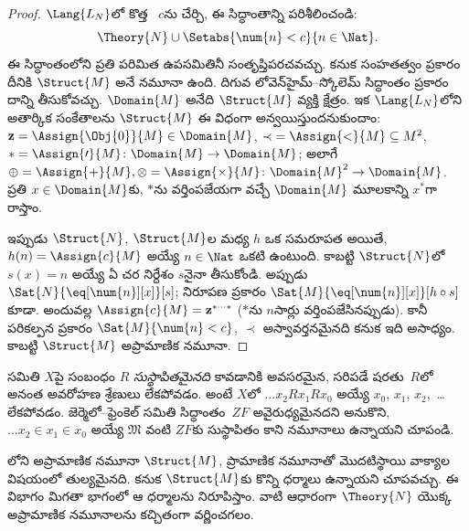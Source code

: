 \documentclass[../../../include/open-logic-section]{subfiles}
\begin{document}
\begin{proof}
$\Lang{L_N}$లో కొత్త ~$c$ను చేర్చి, ఈ సిద్ధాంతాన్ని పరిశీలించండి:
\[
\Theory{N} \cup \Setabs{\num{n} < c}{n \in \Nat}.
\]
ఈ సిద్ధాంతంలోని ప్రతి పరిమిత ఉపసమితినీ సంతృప్తిపరచవచ్చు. కనుక సంహతత్వం ప్రకారం దీనికి $\Struct{M}$ అనే నమూనా ఉంది. దిగువ లోవెన్‌హైమ్--స్కోలెమ్ సిద్ధాంతం ప్రకారం దాన్ని  తీసుకోవచ్చు. $\Domain{M}$ అనేది $\Struct{M}$ వ్యక్తి క్షేత్రం. ఇక $\Lang{L_N}$లోని అతార్కిక సంకేతాలను $\Struct{M}$ ఈ విధంగా అన్వయిస్తుందనుకుందాం: $\mathbf{z} = \Assign{\Obj{0}}{M} \in \Domain{M}$, ${\prec} =
\Assign{<}{M} \subseteq M^2$, $* = \Assign{\prime}{M} \colon
\Domain{M} \to \Domain{M}$; అలాగే $\oplus = \Assign{+}{M}, \otimes =
\Assign{\times}{M} \colon \Domain{M}^2 \to \Domain{M}$. ప్రతి $x
\in \Domain{M}$కు, $*$ను వర్తింపజేయగా వచ్చే $\Domain{M}$ మూలకాన్ని $x^*$గా రాస్తాం.

ఇప్పుడు $\Struct{N}$, $\Struct{M}$ల మధ్య $h$ ఒక సమరూపత అయితే, $h(n) = \Assign{c}{M}$ అయ్యే $n \in \Nat$ ఒకటి ఉంటుంది. కాబట్టి $\Struct{N}$లో $s(x) = n$ అయ్యే ఏ చర నిర్దేశం $s$నైనా తీసుకోండి. అప్పుడు $\Sat{N}{\eq[\num{n}][x]}[s]$;  నిరూపణ ప్రకారం $\Sat{M}{\eq[\num{n}][x]}[h \circ s]$ కూడా. అందువల్ల $\Assign{c}{M} =
\mathbf{z}^{*\cdots *}$ ($*$ను $n$సార్లు వర్తింపజేసినప్పుడు). కానీ పరికల్పన ప్రకారం $\Sat{M}{\num{n} < c}$, $\prec$ అస్వావర్తనమైనది కనుక ఇది అసాధ్యం. కాబట్టి $\Struct{M}$ అప్రామాణిక నమూనా.
\end{proof}

\begin{prob}
సమితి $X$పై సంబంధం $R$ \emph{సుస్థాపితమైనది} కావడానికి అవసరమైన, సరిపడే షరతు~$R$లో అనంత అవరోహణ శ్రేణులు లేకపోవడం. అంటే $X$లో $\dots x_2Rx_1Rx_0$ అయ్యే $x_0$, $x_1$, $x_2$,~\dots లేకపోవడం. జెర్మెలో--ఫ్రెంకెల్ సమితి సిద్ధాంతం~$ZF$ అవైరుధ్యమైనదని అనుకొని, $\dots x_2 \in x_1 \in x_0$ అయ్యే $\mathfrak{M}$ వంటి $ZF$కు సుస్థాపితం కాని నమూనాలు ఉన్నాయని చూపండి.
\end{prob}

లోని అప్రామాణిక నమూనా $\Struct{M}$, ప్రామాణిక నమూనాతో మొదటిస్థాయి వాక్యాల విషయంలో తుల్యమైనది. కనుక $\Struct{M}$కు కొన్ని ధర్మాలు ఉన్నాయని చూపవచ్చు. ఈ విభాగం మిగతా భాగంలో ఆ ధర్మాలను నిరూపిస్తాం. వాటి ఆధారంగా $\Theory{N}$ యొక్క  అప్రామాణిక నమూనాలను కచ్చితంగా వర్ణించగలం.
\end{document}
